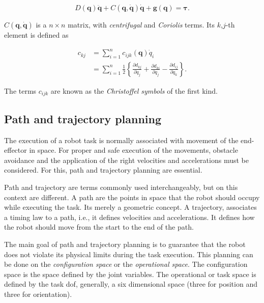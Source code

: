 \begin{equation}
    \label{eq:equations_motion}
    D(\boldsymbol{q})\ddot{\boldsymbol{q}} + C(\boldsymbol{q}, \dot{\boldsymbol{q}})\dot{\boldsymbol{q}} + \boldsymbol{g}(\boldsymbol{q}) = \boldsymbol{\tau}.
\end{equation}

$C(\boldsymbol{q}, \dot{\boldsymbol{q}})$ is a $n \times n$ matrix, with \emph{centrifugal} and \emph{Coriolis} terms. Its $k$,$j$-th element is defined as

\begin{align}
    c_{kj} &= \sum^n_{i=1} c_{ijk}(\boldsymbol{q})\dot{q}_i \\
    &= \sum^n_{i=1} \frac{1}{2} \left\{ \frac{\partial d_{kj}}{\partial q_j} + \frac{\partial d_{ki}}{\partial q_j} - \frac{\partial d_{ij}}{\partial q_k} \right\}.
\end{align}

The terms $c_{ijk}$ are known as the \emph{Christoffel symbols} of the first kind.


\subsection{Path and trajectory planning}
\label{subsec:path_trajectory_planning}

The execution of a robot task is normally associated with movement of the end-effector in space. For proper and safe execution of the movements, obstacle avoidance and the application of the right velocities and accelerations must be considered. For this, path and trajectory planning are essential.

Path and trajectory are terms commonly used interchangeably, but on this context are different. A path are the points in space that the robot should occupy while executing the task. Its merely a geometric concept. A trajectory, associates a timing law to a path, i.e., it defines velocities and accelerations. It defines how the robot should move from the start to the end of the path.

The main goal of path and trajectory planning is to guarantee that the robot does not violate its physical limits during the task execution. This planning can be done on the \emph{configuration space} or the \emph{operational space}. The configuration space is the space defined by the joint variables. The operational or task space is defined by the task \gls{dof}, generally, a six dimensional space (three for position and three for orientation).

